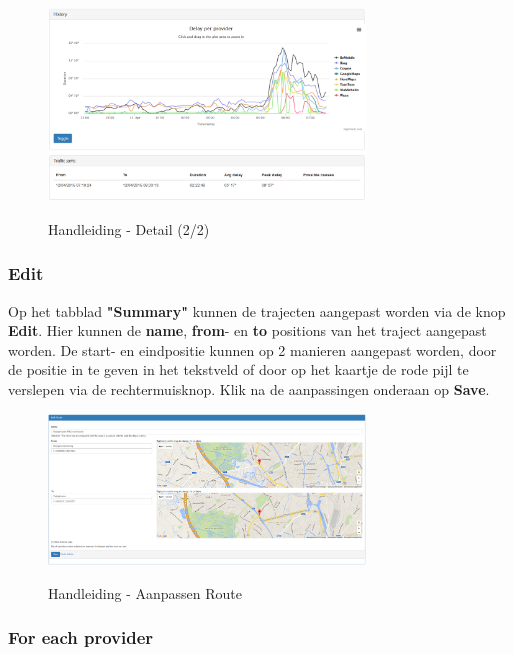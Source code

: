 \begin{figure}[H]
\centering
\includegraphics[width=0.75\textwidth]{images/detail2.png}\\
\caption{Handleiding - Detail (2/2)}
\end{figure}

\subsubsection{Edit}

Op het tabblad \textbf{"Summary"} kunnen de trajecten aangepast worden via de knop \textbf{Edit}. Hier kunnen de \textbf{name}, \textbf{from}- en \textbf{to} positions van het traject aangepast worden. De start- en eindpositie kunnen op 2 manieren aangepast worden, door de positie in te geven in het tekstveld of door op het kaartje de rode pijl te verslepen via de rechtermuisknop. Klik na de aanpassingen onderaan op \textbf{Save}.

\begin{figure}[H]
\centering
\includegraphics[width=0.75\textwidth]{images/editRoute.png}\\
\caption{Handleiding - Aanpassen Route}
\end{figure}

\subsubsection{For each provider}

